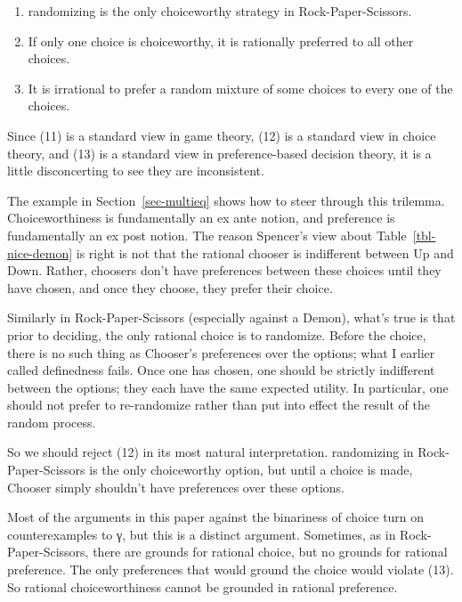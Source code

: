 \documentclass[
  11pt,
  letterpaper,
  DIV=11,
  numbers=noendperiod,
  twoside]{scrartcl}
\providecommand{\tightlist}{%
  \setlength{\itemsep}{0pt}\setlength{\parskip}{0pt}}
\begin{document}
\begin{enumerate}
\def\labelenumi{(\arabic{enumi})}
\setcounter{enumi}{10}
\tightlist
\item
  randomizing is the only choiceworthy strategy in Rock-Paper-Scissors.
\item
  If only one choice is choiceworthy, it is rationally preferred to all
  other choices.
\item
  It is irrational to prefer a random mixture of some choices to every
  one of the choices.
\end{enumerate}

Since (11) is a standard view in game theory, (12) is a standard view in
choice theory, and (13) is a standard view in preference-based decision
theory, it is a little disconcerting to see they are inconsistent.

The example in Section~\ref{sec-multieq} shows how to steer through this
trilemma. Choiceworthiness is fundamentally an ex ante notion, and
preference is fundamentally an ex post notion. The reason Spencer's view
about Table~\ref{tbl-nice-demon} is right is not that the rational
chooser is indifferent between Up and Down. Rather, choosers don't have
preferences between these choices until they have chosen, and once they
choose, they prefer their choice.

Similarly in Rock-Paper-Scissors (especially against a Demon), what's
true is that prior to deciding, the only rational choice is to
randomize. Before the choice, there is no such thing as Chooser's
preferences over the options; what I earlier called definedness fails.
Once one has chosen, one should be strictly indifferent between the
options; they each have the same expected utility. In particular, one
should not prefer to re-randomize rather than put into effect the result
of the random process.

So we should reject (12) in its most natural interpretation. randomizing
in Rock-Paper-Scissors is the only choiceworthy option, but until a
choice is made, Chooser simply shouldn't have preferences over these
options.

Most of the arguments in this paper against the binariness of choice
turn on counterexamples to γ, but this is a distinct argument.
Sometimes, as in Rock-Paper-Scissors, there are grounds for rational
choice, but no grounds for rational preference. The only preferences
that would ground the choice would violate (13). So rational
choiceworthiness cannot be grounded in rational preference.
\end{document}
